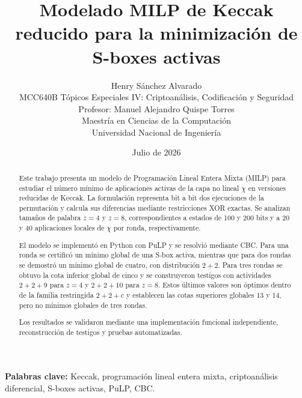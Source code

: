 \documentclass[11pt,a4paper]{article}
\title{
    \textbf{
        Modelado MILP de Keccak reducido para la minimización
        de S-boxes activas
    }
}
\author{
    Henry Sánchez Alvarado\\[0.35em]
    \small MCC640B Tópicos Especiales IV:
    Criptoanálisis, Codificación y Seguridad\\
    \small Profesor: Manuel Alejandro Quispe Torres\\
    \small Maestría en Ciencias de la Computación\\
    \small Universidad Nacional de Ingeniería
}
\date{Julio de 2026}
\begin{document}
\maketitle

\begin{abstract}
Este trabajo presenta un modelo de Programación Lineal Entera Mixta
(MILP) para estudiar el número mínimo de aplicaciones activas de la
capa no lineal $\chi$ en versiones reducidas de Keccak. La formulación
representa bit a bit dos ejecuciones de la permutación y calcula sus
diferencias mediante restricciones XOR exactas. Se analizan tamaños de
palabra $z=4$ y $z=8$, correspondientes a estados de 100 y 200 bits y
a 20 y 40 aplicaciones locales de $\chi$ por ronda, respectivamente.

El modelo se implementó en Python con PuLP y se resolvió mediante CBC.
Para una ronda se certificó un mínimo global de una S-box activa, mientras
que para dos rondas se demostró un mínimo global de cuatro, con distribución
$2+2$. Para tres rondas se obtuvo la cota inferior global de cinco y se
construyeron testigos con actividades $2+2+9$ para $z=4$ y $2+2+10$
para $z=8$. Estos últimos valores son óptimos dentro de la familia
restringida $2+2+c$ y establecen las cotas superiores globales 13 y 14,
pero no mínimos globales de tres rondas.

Los resultados se validaron mediante una implementación funcional
independiente, reconstrucción de testigos y pruebas automatizadas.
\end{abstract}

\noindent\textbf{Palabras clave:} Keccak, programación lineal entera mixta,
criptoanálisis diferencial, S-boxes activas, PuLP, CBC.












\printbibliography[title={Referencias}]
\end{document}
